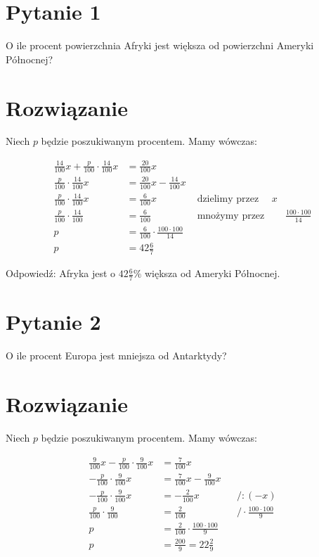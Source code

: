 \documentclass[10pt]{article}
\begin{document}
\section*{Pytanie 1}
O ile procent powierzchnia Afryki jest większa od powierzchni Ameryki Północnej?

\section*{Rozwiązanie}
Niech \(p\) będzie poszukiwanym procentem. Mamy wówczas:

\[
\begin{array}{rlrl}
\frac{14}{100} x+\frac{p}{100} \cdot \frac{14}{100} x & =\frac{20}{100} x & \\
\frac{p}{100} \cdot \frac{14}{100} x & =\frac{20}{100} x-\frac{14}{100} x & \\
\frac{p}{100} \cdot \frac{14}{100} x & =\frac{6}{100} x & \text { dzielimy przez } \quad x \\
\frac{p}{100} \cdot \frac{14}{100} & =\frac{6}{100} & \text { mnożymy przez } & \frac{100 \cdot 100}{14} \\
p & =\frac{6}{100} \cdot \frac{100 \cdot 100}{14} & \\
p & =42 \frac{6}{7} &
\end{array}
\]

Odpowiedź: Afryka jest o \(42 \frac{6}{7} \%\) większa od Ameryki Północnej.

\section*{Pytanie 2}
O ile procent Europa jest mniejsza od Antarktydy?

\section*{Rozwiązanie}
Niech \(p\) będzie poszukiwanym procentem. Mamy wówczas:

\[
\begin{aligned}
\frac{9}{100} x-\frac{p}{100} \cdot \frac{9}{100} x & =\frac{7}{100} x & & \\
-\frac{p}{100} \cdot \frac{9}{100} x & =\frac{7}{100} x-\frac{9}{100} x & & \\
-\frac{p}{100} \cdot \frac{9}{100} x & =-\frac{2}{100} x & & /:(-x) \\
\frac{p}{100} \cdot \frac{9}{100} & =\frac{2}{100} & & / \cdot \frac{100 \cdot 100}{9} \\
p & =\frac{2}{100} \cdot \frac{100 \cdot 100}{9} & & \\
p & =\frac{200}{9}=22 \frac{2}{9} & &
\end{aligned}
\]
\end{document}
